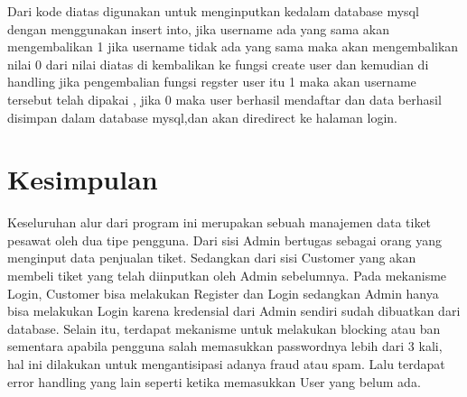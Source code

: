 \documentclass[a4paper,12pt]{article}
\begin{document}
\FloatBarrier
Dari kode diatas digunakan untuk menginputkan kedalam database mysql dengan menggunakan insert into, jika username ada yang sama akan mengembalikan 1 jika username tidak ada yang sama maka akan mengembalikan 
nilai 0 dari nilai diatas di kembalikan ke fungsi create user dan kemudian di handling jika pengembalian fungsi regster user itu 1 maka akan username tersebut telah dipakai , jika 0 maka user berhasil mendaftar dan data berhasil 
disimpan dalam database mysql,dan akan diredirect ke halaman login.
\section{Kesimpulan}
Keseluruhan alur dari program ini merupakan sebuah manajemen data tiket pesawat oleh dua tipe pengguna.
Dari sisi Admin bertugas sebagai orang yang menginput data penjualan tiket. Sedangkan dari sisi Customer yang akan membeli tiket yang telah diinputkan oleh Admin sebelumnya.
Pada mekanisme Login, Customer bisa melakukan Register dan Login sedangkan Admin hanya bisa melakukan Login karena kredensial dari Admin sendiri sudah dibuatkan dari database. Selain itu, terdapat mekanisme untuk melakukan blocking atau ban
sementara apabila pengguna salah memasukkan passwordnya lebih dari 3 kali, hal ini dilakukan untuk mengantisipasi adanya fraud atau spam. Lalu terdapat error handling yang lain seperti ketika memasukkan User yang belum ada.
\end{document}
